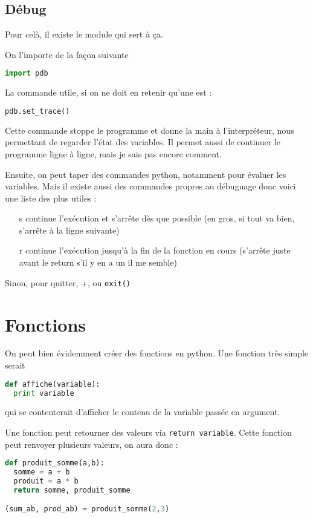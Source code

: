 \documentclass[a4paper,twoside]{article}
\begin{document}
\subsection{Débug}
Pour celà, il existe le module  qui sert à ça.

On l'importe de la façon suivante
\begin{lstlisting}[language=python]
import pdb
\end{lstlisting}

La commande utile, si on ne doit en retenir qu'une est :
\begin{lstlisting}[language=python]
pdb.set_trace()
\end{lstlisting}

Cette commande stoppe le programme et donne la main à l'interpréteur, nous permettant de regarder l'état des variables. Il permet aussi de continuer le programme ligne à ligne, mais je sais pas encore comment.

Ensuite, on peut taper des commandes python, notamment pour évaluer les variables. Mais il existe aussi des commandes propres au débuguage donc voici une liste des plus utiles :
\begin{itemize}
\item[s] continue l'exécution et s'arrête dès que possible (en gros, si tout va bien, s'arrête à la ligne suivante)
\item[r] continue l'exécution jusqu'à la fin de la fonction en cours (s'arrête juste avant le return s'il y en a un il me semble)
\end{itemize}
Sinon, pour quitter, +, ou \texttt{exit()}

\section{Fonctions}
On peut bien évidemment créer des fonctions en python. Une fonction très simple serait
\begin{lstlisting}[language=python]
def affiche(variable):
  print variable
\end{lstlisting}
qui se contenterait d'afficher le contenu de la variable passée en argument.

Une fonction peut retourner des valeurs via \verb|return variable|. Cette fonction peut renvoyer plusieurs valeurs, on aura donc :
\begin{lstlisting}[language=python]
def produit_somme(a,b):
  somme = a + b
  produit = a * b
  return somme, produit_somme

(sum_ab, prod_ab) = produit_somme(2,3)
\end{lstlisting}
\end{document}
